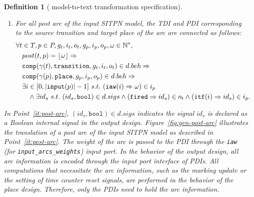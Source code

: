 \documentclass[pdflatex,sn-mathphys]{sn-jnl}%
\theoremstyle{thmstyleone}%
\theoremstyle{thmstyletwo}%
\theoremstyle{thmstylethree}%
\newtheorem{definition}{Definition}%
\begin{document}
\begin{definition}[\hilecop{} model-to-text transformation specification]
  \begin{enumerate}[resume]        
  \item\label{it:post-arc} For all post arc of the input SITPN model,
    the TDI and PDI corresponding to the source transition and target
    place of the arc are connected as follows:
    \begin{equation*}
      \begin{aligned}[t]
        \forall{}t&\in{}T,p\in{}P,g_t,i_t,o_t,g_p,i_p,o_p,\omega\in\mathbb{N}^{*}, \\
                  & post(t,p)=\lfloor\omega\rfloor\Rightarrow \\
                  & \mathtt{comp}(\gamma(t),\mathtt{transition},g_t,i_t,o_t)\in{}d.beh\Rightarrow \\
                  & \mathtt{comp}(\gamma(p),\mathtt{place},g_p,i_p,o_p)\in{}d.beh\Rightarrow\\
                  &
                    \begin{aligned}[t]
                      \exists{}i & \in[0,\vert\mathtt{input}(p)\vert-1]~s.t.~(\mathtt{iaw}(i)\Rightarrow\omega)\in{}i_p \\
                                 & \land\exists{}id_s~s.t.~(id_s,\mathtt{bool})\in{}d.sigs
                                   \land(\mathtt{fired}\Rightarrow{}id_s)\in{}o_t\land(\mathtt{itf}(i)\Rightarrow{}id_s)\in{}i_p. \\
                    \end{aligned}
        \\
      \end{aligned}
    \end{equation*}
  \end{enumerate}
  
  \bigskip

  In Point~\ref{it:post-arc}, $(id_s,\mathtt{bool})\in{}d.sigs$
  indicates the signal $id_s$ is declared as a Boolean internal signal
  in the output design. Figure~\ref{fig:gen-post-arc} illustrates the
  translation of a post arc of the input SITPN model as described in
  Point~\ref{it:post-arc}. The weight of the arc is passed to the PDI
  through the \texttt{iaw} (for \texttt{input\_arcs\_weights}) input
  port. In the behavior of the output design, all arc information is
  encoded through the input port interface of PDIs. All computations
  that necessitate the arc information, such as the marking update or
  the setting of time counter reset signals, are performed in the
  behavior of the place design. Therefore, only the PDIs need to hold
  the arc information.


\end{definition}
\end{document}
